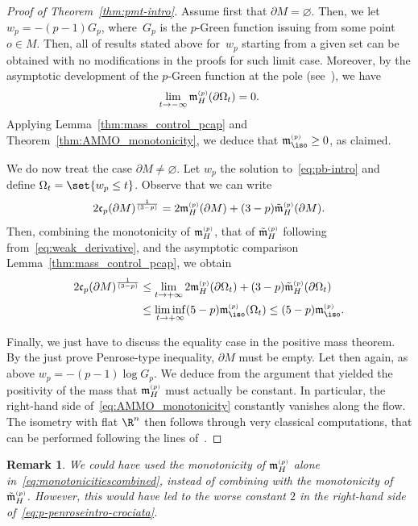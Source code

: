 \documentclass[10pt,a4paper]{amsart}
\numberwithin{equation}{section}
\newtheorem{Remark}[Theorem]{Remark} }
\newcounter{case}
\renewcommand{\ncapa}{\mathfrak{c}}
\newcommand{\ma}{\mathfrak{m}}
\newcommand{\tp}[1][p]{{\text{\tiny$(#1)$}}}
\begin{document}
\begin{proof}[Proof of Theorem~\ref{thm:pmt-intro}] Assume first that $\partial M = \varnothing$.
Then, we let $w_p = -(p-1)G_p$, where~$G_p$ is the $p$-Green function issuing from some point $o \in M$. Then, all of results stated above for~$w_p$ starting from a given set can be obtained with no modifications in the proofs for such limit case. Moreover, by the asymptotic development of the $p$-Green function at the pole (see~\cite[Theorem~2.4]{mari_flowlaplaceapproximationnew_2022}), we have
\[
 \lim_{t \to -\infty}\ma^{\tp}_H ( \partial \Omega_t) = 0.
\]
 Applying Lemma~\ref{thm:mass_control_pcap} and Theorem~\ref{thm:AMMO_monotonicity}, we deduce that $\ma^{\tp}_{\iso} \geq 0$, as claimed.

 We do now treat the case $\partial M \neq \varnothing$. Let $w_p$ the solution to~\eqref{eq:pb-intro} and define $\Omega_t = \set{w_p \leq t}$. Observe that we can write
 \[
 2\ncapa_p(\partial M)^{\frac{1}{(3-p)}} = 2 \ma_{H}^{\tp}(\partial M)+(3-p)\tilde{\ma}_{H}^{\tp}(\partial M).
 \]
 Then, combining the monotonicity of $\ma_{H}^{\tp}$, that of $\tilde{\ma}_{H}^{\tp}$ following from~\eqref{eq:weak_derivative}, and the asymptotic comparison Lemma~\ref{thm:mass_control_pcap}, we obtain
\begin{align}
 2\ncapa_p(\partial M)^{\frac{1}{(3-p)}} &{}\leq \lim_{t \to +\infty} 2 \ma_{H}^{\tp}(\partial \Omega_t)+(3-p)\tilde{\ma}_{H}^{\tp}(\partial \Omega_t)\nonumber\\
 &{} \leq \liminf_{t \to +\infty} (5-p) \ma_{\iso}^{\tp}(\Omega_t) \leq (5-p) \ma^{\tp}_{\iso}.\label{eq:monotonicitiescombined}
\end{align}

Finally, we just have to discuss the equality case in the positive mass theorem. By the just prove Penrose-type inequality, $\partial M$ must be empty. Let then again, as above $w_p = -(p-1) \log G_p$. We deduce from the argument that yielded the positivity of the mass that $\ma^{\tp}_H$ must actually be constant. In particular, the right-hand side of~\eqref{eq:AMMO_monotonicity} constantly vanishes along the flow. The isometry with flat $\R^n$ then follows through very classical computations, that can be performed following the lines of~\cite[proof of Main Theorem~2]{huisken_inversemeancurvatureflow_2001}.\end{proof}
\begin{Remark}
We could have used the monotonicity of $\ma_{H}^{\tp}$ alone in~\eqref{eq:monotonicitiescombined}, instead of combining with the monotonicity of $\tilde{\ma}_{H}^{\tp}$. However, this would have led to the worse constant $2$ in the right-hand side of~\eqref{eq:p-penroseintro-crociata}.
\end{Remark}
\end{document}
